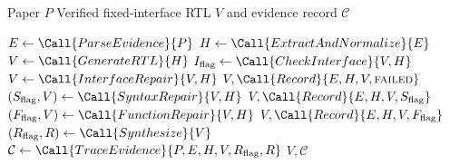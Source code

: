 \begin{algorithm}[H]
\caption{Paper2Gate Workflow}
\label{alg:paper2gate}
\begin{algorithmic}[1]
\Require Paper $P$
\Ensure Verified fixed-interface RTL $V$ and evidence record $\mathcal{C}$

\State $E\gets\Call{ParseEvidence}{P}$
\State $H\gets\Call{ExtractAndNormalize}{E}$
\State $V\gets\Call{GenerateRTL}{H}$
\State $I_{\mathrm{flag}}\gets\Call{CheckInterface}{V,H}$
    \State $V\gets\Call{InterfaceRepair}{V,H}$
\EndIf
{}
    \State \Return $V,\Call{Record}{E,H,V,\textsc{failed}}$
\EndIf
\State $(S_{\mathrm{flag}},V)\gets\Call{SyntaxRepair}{V,H}$
    \State \Return $V,\Call{Record}{E,H,V,S_{\mathrm{flag}}}$
\EndIf
\State $(F_{\mathrm{flag}},V)\gets\Call{FunctionRepair}{V,H}$
    \State \Return $V,\Call{Record}{E,H,V,F_{\mathrm{flag}}}$
\EndIf
\State $(R_{\mathrm{flag}},R)\gets\Call{Synthesize}{V}$
\State $\mathcal{C}\gets\Call{TraceEvidence}{P,E,H,V,R_{\mathrm{flag}},R}$
\State \Return $V,\mathcal{C}$
\end{algorithmic}
\end{algorithm}
